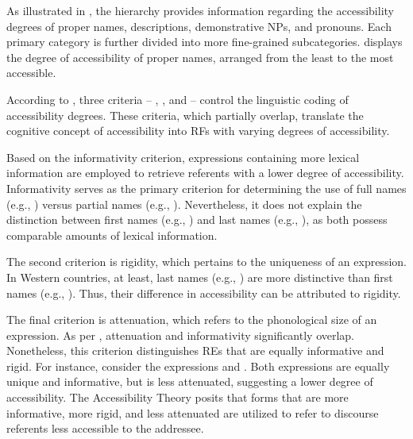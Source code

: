 As illustrated in , the hierarchy provides information regarding the accessibility degrees of proper names, descriptions, demonstrative NPs, and pronouns. Each primary category is further divided into more fine-grained subcategories.  displays the degree of accessibility of proper names, arranged from the least to the most accessible.

\begin{table}[h!]
\caption{The degree of accessibility of proper names, arranged from the least to the most accessible.}\label{tab:accessibilitypropername}
\end{table}

According to \citet{ariel1990accessing}, three criteria -- , , and  -- control the linguistic coding of accessibility degrees. These criteria, which partially overlap, translate the cognitive concept of accessibility into RFs with varying degrees of accessibility.

Based on the informativity criterion, expressions containing more lexical information are employed to retrieve referents with a lower degree of accessibility.
Informativity serves as the primary criterion for determining the use of full names (e.g., ) versus partial names (e.g., ). Nevertheless, it does not explain the distinction between first names (e.g., ) and last names (e.g., ), as both possess comparable amounts of lexical information.


The second criterion is rigidity, which pertains to the uniqueness of an expression. In Western countries, at least, last names (e.g., ) are more distinctive than first names (e.g., ). Thus, their difference in accessibility can be attributed to rigidity.


The final criterion is attenuation, which refers to the phonological size of an expression. As per \citet{ariel1991function}, attenuation and informativity significantly overlap. Nonetheless, this criterion distinguishes REs that are equally informative and rigid. For instance, consider the expressions  and . Both expressions are equally unique and informative, but  is less attenuated, suggesting a lower degree of accessibility. The Accessibility Theory posits that forms that are more informative, more rigid, and less attenuated are utilized to refer to discourse referents less accessible to the addressee.


